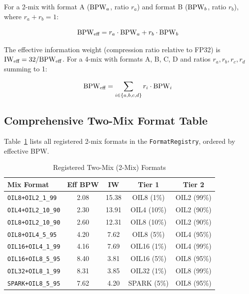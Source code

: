 For a 2-mix with format A ($\textnormal{BPW}_a$, ratio $r_a$) and format B
($\textnormal{BPW}_b$, ratio $r_b$), where $r_a + r_b = 1$:

\begin{equation}
\textnormal{BPW}_{\text{eff}} = r_a \cdot \textnormal{BPW}_a + r_b \cdot \textnormal{BPW}_b
\label{eq:2mix_bpw}
\end{equation}

\noindent The effective information weight (compression ratio relative
to FP32) is $\mathrm{IW}_{\text{eff}} = 32 / \textnormal{BPW}_{\text{eff}}$.  For a
4-mix with formats A, B, C, D and ratios $r_a, r_b, r_c, r_d$ summing
to 1:

\begin{equation}
\textnormal{BPW}_{\text{eff}} = \sum_{i \in \{a,b,c,d\}} r_i \cdot \textnormal{BPW}_i
\label{eq:4mix_bpw}
\end{equation}

\subsection{Comprehensive Two-Mix Format Table}

Table~\ref{tab:two_mix} lists all registered 2-mix formats in the
\texttt{FormatRegistry}, ordered by effective BPW.

\begin{table}[htbp]
\centering
\caption{Registered Two-Mix (2-Mix) Formats}
\label{tab:two_mix}
\small
\begin{tabular}{l c c c c}
\toprule
\textbf{Mix Format} & \textbf{Eff BPW} & \textbf{IW} & \textbf{Tier 1} & \textbf{Tier 2} \\
\midrule
\texttt{OIL8+OIL2\_1\_99}   & 2.08 & 15.38 & OIL8 (1\%)  & OIL2 (99\%) \\
\texttt{OIL4+OIL2\_10\_90}  & 2.30 & 13.91 & OIL4 (10\%) & OIL2 (90\%) \\
\texttt{OIL8+OIL2\_10\_90}  & 2.60 & 12.31 & OIL8 (10\%) & OIL2 (90\%) \\
\texttt{OIL8+OIL4\_5\_95}   & 4.20 & 7.62  & OIL8 (5\%)  & OIL4 (95\%) \\
\texttt{OIL16+OIL4\_1\_99}  & 4.16 & 7.69  & OIL16 (1\%) & OIL4 (99\%) \\
\texttt{OIL16+OIL8\_5\_95}  & 8.40 & 3.81  & OIL16 (5\%) & OIL8 (95\%) \\
\texttt{OIL32+OIL8\_1\_99}  & 8.31 & 3.85  & OIL32 (1\%) & OIL8 (99\%) \\
\texttt{SPARK+OIL8\_5\_95}  & 7.62 & 4.20  & SPARK (5\%) & OIL8 (95\%) \\
\bottomrule
\end{tabular}
\end{table}

